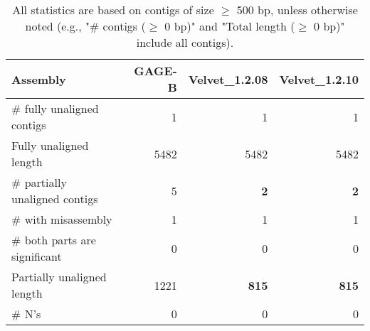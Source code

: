 \documentclass[12pt,a4paper]{article}
\begin{document}
\begin{table}[ht]
\begin{center}
\caption{All statistics are based on contigs of size $\geq$ 500 bp, unless otherwise noted (e.g., "\# contigs ($\geq$ 0 bp)" and "Total length ($\geq$ 0 bp)" include all contigs).}
\begin{tabular}{|l*{3}{|r}|}
\hline
Assembly & GAGE-B & Velvet\_1.2.08 & Velvet\_1.2.10 \\ \hline
\# fully unaligned contigs & 1 & 1 & 1 \\ \hline
Fully unaligned length & 5482 & 5482 & 5482 \\ \hline
\# partially unaligned contigs & 5 & {\bf 2} & {\bf 2} \\ \hline
\hspace{5mm}\# with misassembly & 1 & 1 & 1 \\ \hline
\hspace{5mm}\# both parts are significant & 0 & 0 & 0 \\ \hline
Partially unaligned length & 1221 & {\bf 815} & {\bf 815} \\ \hline
\# N's & 0 & 0 & 0 \\ \hline
\end{tabular}
\end{center}
\end{table}
\end{document}
